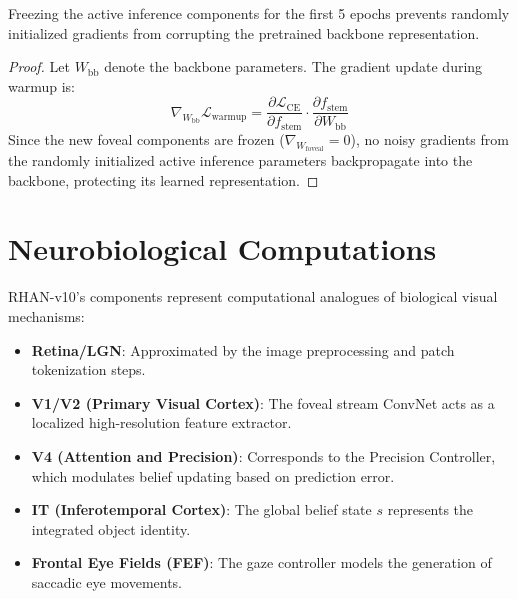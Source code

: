 \begin{corollary}
Freezing the active inference components for the first 5 epochs prevents randomly initialized gradients from corrupting the pretrained backbone representation.
\end{corollary}

\begin{proof}
Let $W_{\text{bb}}$ denote the backbone parameters. The gradient update during warmup is:
\begin{equation}
\nabla_{W_{\text{bb}}} \mathcal{L}_{\text{warmup}} = \frac{\partial \mathcal{L}_{\text{CE}}}{\partial f_{\text{stem}}} \cdot \frac{\partial f_{\text{stem}}}{\partial W_{\text{bb}}}
\end{equation}
Since the new foveal components are frozen ($\nabla_{W_{\text{foveal}}} = 0$), no noisy gradients from the randomly initialized active inference parameters backpropagate into the backbone, protecting its learned representation.
\end{proof}

\section{Neurobiological Computations}
RHAN-v10's components represent computational analogues of biological visual mechanisms:
\begin{itemize}
    \item \textbf{Retina/LGN}: Approximated by the image preprocessing and patch tokenization steps.
    \item \textbf{V1/V2 (Primary Visual Cortex)}: The foveal stream ConvNet acts as a localized high-resolution feature extractor.
    \item \textbf{V4 (Attention and Precision)}: Corresponds to the Precision Controller, which modulates belief updating based on prediction error.
    \item \textbf{IT (Inferotemporal Cortex)}: The global belief state $s$ represents the integrated object identity.
    \item \textbf{Frontal Eye Fields (FEF)}: The gaze controller models the generation of saccadic eye movements.
\end{itemize}

